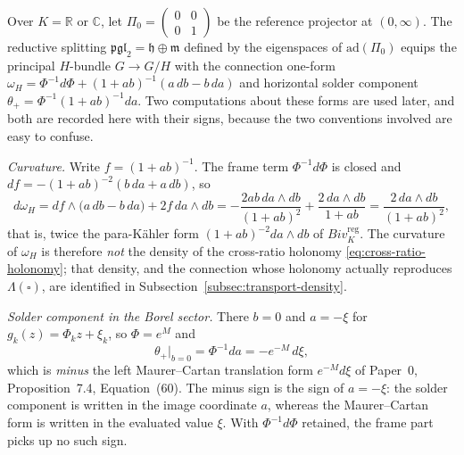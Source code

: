 \begin{remark}
\label{rem:reductive-connection}
Over $K=\mathbb{R}$ or $\mathbb{C}$, let $\Pi_0=\begin{pmatrix}0&0\\0&1\end{pmatrix}$
be the reference projector at $(0,\infty)$. The reductive splitting
$\mathfrak{pgl}_2 = \mathfrak{h}\oplus\mathfrak{m}$ defined by the eigenspaces of
$\mathrm{ad}(\Pi_0)$ equips the principal $H$-bundle $G\to G/H$ with the connection
one-form $\omega_H = \Phi^{-1}d\Phi + (1+ab)^{-1}(a\,db - b\,da)$ and horizontal
solder component $\theta_+ = \Phi^{-1}(1+ab)^{-1}da$.  Two computations about
these forms are used later, and both are recorded here with their signs, because
the two conventions involved are easy to confuse.

\emph{Curvature.}  Write $f=(1+ab)^{-1}$.  The frame term $\Phi^{-1}d\Phi$ is
closed and $df=-(1+ab)^{-2}(b\,da+a\,db)$, so
\begin{equation}
  d\omega_H
  =df\wedge\bigl(a\,db-b\,da\bigr)+2f\,da\wedge db
  =-\frac{2ab\,da\wedge db}{(1+ab)^{2}}+\frac{2\,da\wedge db}{1+ab}
  =\frac{2\,da\wedge db}{(1+ab)^{2}} ,
  \label{eq:reductive-connection-curvature}
\end{equation}
that is, twice the para-K\"ahler form $(1+ab)^{-2}da\wedge db$ of
$Biv_K^{\mathrm{reg}}$.  The curvature of $\omega_H$ is therefore \emph{not} the
density of the cross-ratio holonomy \eqref{eq:cross-ratio-holonomy}; that
density, and the connection whose holonomy actually reproduces
$\Lambda(\square)$, are identified in Subsection~\ref{subsec:transport-density}.

\emph{Solder component in the Borel sector.}  There $b=0$ and $a=-\xi$ for
$g_k(z)=\Phi_k z+\xi_k$, so $\Phi=e^{M}$ and
\begin{equation}
  \theta_+\big|_{b=0}
  =\Phi^{-1}da=-e^{-M}\,d\xi ,
  \label{eq:solder-borel}
\end{equation}
which is \emph{minus} the left Maurer--Cartan translation form $e^{-M}d\xi$ of
Paper~0, Proposition~7.4, Equation~(60).  The minus sign is the sign of
$a=-\xi$: the solder component is written in the image coordinate $a$, whereas
the Maurer--Cartan form is written in the evaluated value $\xi$.  With
$\Phi^{-1}d\Phi$ retained, the frame part picks up no such sign.
\end{remark}

